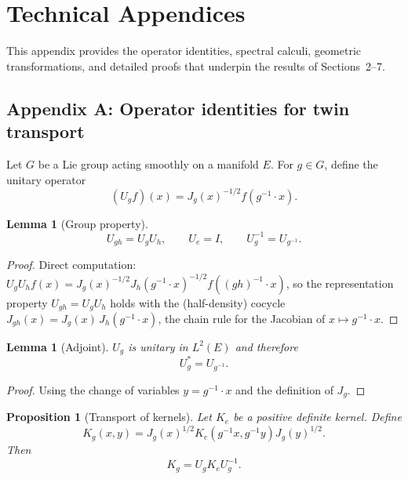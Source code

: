 \documentclass[11pt]{article}
\newtheorem{lemma}[theorem]{Lemma}
\newtheorem{proposition}[theorem]{Proposition}
\theoremstyle{definition}
\begin{document}
	
	\appendix
\appendix

\section{Technical Appendices}
\label{sec:appendix-technical}

This appendix provides the operator identities, spectral calculi, geometric transformations, and detailed proofs that underpin the results of Sections~2–7.

\subsection{Appendix A: Operator identities for twin transport}

Let $G$ be a Lie group acting smoothly on a manifold $E$.
For $g\in G$, define the unitary operator
\[
(U_gf)(x)=J_g(x)^{-1/2} f(g^{-1}\cdot x).
\]

\begin{lemma}[Group property]
	\[
	U_{gh} = U_g U_h,\qquad U_e=I,\qquad U_g^{-1}=U_{g^{-1}}.
	\]
\end{lemma}

\begin{proof}
	Direct computation: $U_g U_h f(x) = J_g(x)^{-1/2} J_h(g^{-1}\cdot x)^{-1/2} f((gh)^{-1}\cdot x)$, so the representation property $U_{gh}=U_gU_h$ holds with the (half-density) cocycle $J_{gh}(x)=J_g(x)\,J_h(g^{-1}\cdot x)$, the chain rule for the Jacobian of $x\mapsto g^{-1}\cdot x$.
\end{proof}

\begin{lemma}[Adjoint]
	$U_g$ is unitary in $L^2(E)$ and therefore
	\[
	U_g^\ast = U_{g^{-1}}.
	\]
\end{lemma}

\begin{proof}
	Using the change of variables $y=g^{-1}\cdot x$ and the definition of $J_g$.
\end{proof}

\begin{proposition}[Transport of kernels]
	Let $K_e$ be a positive definite kernel.
	Define
	\[
	K_g(x,y) = J_g(x)^{1/2} K_e(g^{-1}x,g^{-1}y) J_g(y)^{1/2}.
	\]
	Then
	\[
	K_g = U_g K_e U_g^{-1}.
	\]
\end{proposition}
\end{document}
